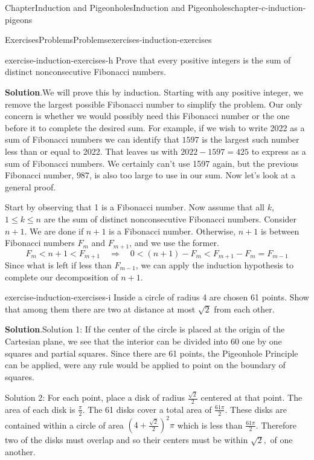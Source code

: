 \documentclass[oneside,10pt,]{book}
\newcommand{\blocktitlefont}{\relax}
\numberwithin{equation}{section}
\newcommand{\lt}{<}
\begin{document}
\begin{chapterptx}{Chapter}{Induction and Pigeonholes}{}{Induction and Pigeonholes}{}{}{chapter-c-induction-pigeons}
\begin{exercises-section}{Exercises}{Problems}{}{Problems}{}{}{exercises-induction-exercises}
\begin{divisionexercise}{7}{}{}{exercise-induction-exercises-h}
Prove that every positive integers is the sum of distinct nonconsecutive Fibonacci numbers.%
\par\smallskip%
\noindent\textbf{\blocktitlefont Solution}.\hypertarget{solution-induction-exercises-h-b}{}\quad{}We will prove this by induction. Starting with any positive integer, we remove the largest possible Fibonacci number to simplify the problem.  Our only concern is whether we would possibly need this Fibonacci number or the one before it to complete the desired sum.  For example, if we wish to write 2022 as a sum of Fibonacci numbers we can identify that \(1597\) is the largest such number less than or equal to 2022.  That leaves us with \(2022-1597=425\) to express as a sum of Fibonacci numbers.  We certainly can't use 1597 again, but the previous Fibonacci number, \(987\), is also too large to use in our sum.   Now let's look at a general proof.%
\par
Start by observing that 1 is a Fibonacci number.  Now assume that  all \(k\), \(1 \leq k \leq n\) are the sum of distinct nonconsecutive Fibonacci numbers.   Consider \(n+1\).  We are done if \(n+1\) is a Fibonacci number.   Otherwise, \(n+1\) is between Fibonacci numbers \(F_m\) and \(F_{m+1}\), and we use the former.%
\begin{equation*}
F_m \lt n+1 \lt F_{m+1} \quad	 \Rightarrow \quad  0\lt (n+1)-F_m \lt F_{m+1}-F_m = F_{m-1}
\end{equation*}
Since what is left if less than \(F_{m-1}\), we can apply the induction hypothesis to complete our decomposition of \(n+1\).%
\end{divisionexercise}%
\begin{divisionexercise}{8}{}{}{exercise-induction-exercises-i}%
Inside a circle of radius 4 are chosen 61 points. Show that among them there are two at distance at most \(\sqrt{2}\) from each other.%
\par\smallskip%
\noindent\textbf{\blocktitlefont Solution}.\hypertarget{solution-induction-exercises-i-b}{}\quad{}Solution 1:  If the center of the circle is placed at the origin of the Cartesian plane, we see that the interior can be divided into 60  one by one squares and partial squares.  Since there are 61 points, the Pigeonhole Principle can be applied, were any rule would be applied to point on the boundary of squares.%
\par
Solution 2:  For each point, place a disk of radius \(\frac{\sqrt{2}}{2}\) centered at that point. The area of each disk is \(\frac{\pi}{2}\).  The 61 disks cover a total area of \(\frac{61\pi}{2}\).  These disks are contained within a circle of area \((4+ \frac{\sqrt{2}}{2})^2 \pi\) which is less than \(\frac{61\pi}{2}\).  Therefore two of the disks must overlap and so their centers must be within \(\sqrt{2},\) of one another.%

\end{divisionexercise}
\end{exercises-section}
\end{chapterptx}
\end{document}
